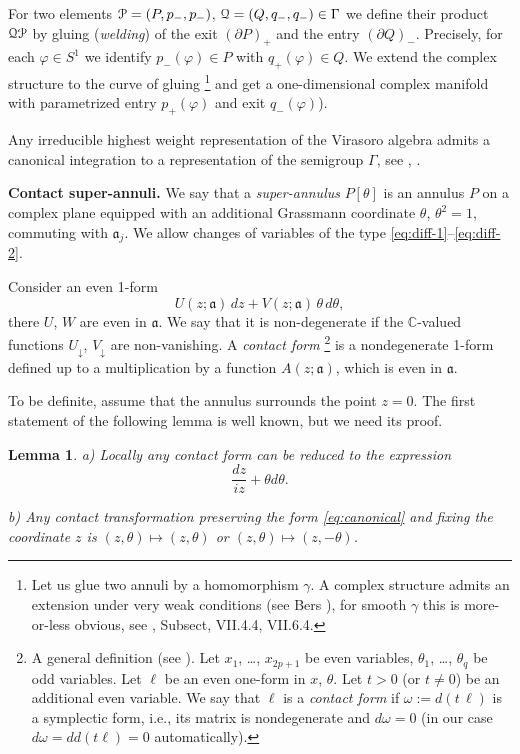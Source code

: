 \documentclass[]{amsart}
\newcounter{sec}
\newcounter{punct}[sec]
\def\punct{\refstepcounter{punct}{\arabic{sec}.\arabic{punct}.  }}
\newtheorem{lemma}[theorem]{Lemma}
\def\phi{\varphi}
\def\cP{\EuScript P}
\def\cQ{\EuScript Q}
\def\fra{\mathfrak a}
\def\C {{\mathbb C }}
\def\sm{\smallskip}
\begin{document}
For two elements $\cP=(P,p_-,p_-)$, $\cQ=(Q,q_-,q_-)\in\Gamma$ we define their product $\cQ \cP$
by gluing ({\it welding}) of the exit $(\partial P)_+$ and the entry $(\partial Q)_-$.
Precisely, for each $\phi\in S^1$ we identify $p_-(\phi)\in P$ with $q_+(\phi)\in Q$.
We extend the complex structure to the curve of gluing%
\footnote{Let us glue two annuli by a homomorphism $\gamma$. A complex structure
admits an extension under very weak conditions (see Bers \cite{Bers}),
for smooth $\gamma$ this is more-or-less obvious, see \cite{Ner-book}, Subsect, VII.4.4, VII.6.4.}
 and
 get a one-dimensional complex manifold with parametrized entry $p_+(\phi)$ and exit $q_-(\phi)$).

Any irreducible highest weight representation of the Virasoro algebra admits a canonical
integration to a representation of the semigroup $\Gamma$, see \cite{Ner-holom}, \cite{Ner-fermion}.

\sm


 
{\bf\punct   Contact super-annuli.} We say that a {\it super-annulus} $P[\theta]$
is  an annulus $P$  on a complex plane  equipped with  an additional Grassmann coordinate $\theta$,
$\theta^2=1$, commuting with $\fra_j$.
We allow changes of variables of the type \eqref{eq:diff-1}--\eqref{eq:diff-2}.

 Consider an even 1-form
\begin{equation}
U(z;\fra)\,dz+ V(z;\fra)\,\theta\,d\theta,
\label{eq:UzVtheta}
\end{equation}
there $U$, $W$ are even in  $\fra$. We say that it is non-degenerate
if the $\C$-valued functions $U_\downarrow$, $V_\downarrow$ are non-vanishing. A {\it contact form}%
\footnote{A general definition (see \cite{Schw}). Let $x_1$, \dots, $x_{2p+1}$ be even variables, $\theta_1$, \dots, $\theta_q$
be odd variables. Let $\ell$ be an even one-form in $x$, $\theta$. Let $t>0$ (or $t\ne 0$) be an additional even variable.
We say that $\ell$ is a {\it contact form} if $\omega:=d(t\,\ell)$  is a symplectic form, i.e., its matrix is nondegenerate
and $d\omega=0$ (in our case $d\omega=dd(t\ell)=0$  automatically).
} 
is a nondegenerate 1-form defined up to a multiplication by a function $A(z;\fra)$, which is even in  $\fra$.

To be definite, assume that the annulus surrounds the point $z=0$. The first statement of the following lemma is well known,
but we need its proof.

\begin{lemma}
	\label{l:canonical}
{\rm a)} Locally any contact form can be reduced
to the expression 
\begin{equation}
\frac{dz}{iz}+ \theta d\theta.
\label{eq:canonical}
\end{equation}

{\rm b)}	Any contact transformation preserving the form \eqref{eq:canonical}
and fixing the coordinate $z$ 
is
$(z,\theta)\mapsto (z,\theta)$ or $(z,\theta)\mapsto (z,-\theta)$.
%
\end{lemma}
\end{document}
